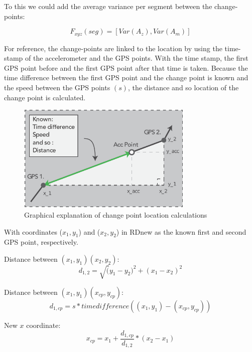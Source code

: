 To this we could add the average variance per segment between the change-points:

\begin{equation}
F_{xyz}(seg) = [Var(A_{z}), Var(A_{m})]
\end{equation}

For reference, the change-points are linked to the location by using the time-stamp of the accelerometer and the GPS points. With the time stamp, the first GPS point before and the first GPS point after that time is taken. Because the time difference between the first GPS point and the change point is known and the speed between the GPS points $(s)$, the distance and so location of the change point is calculated. 

\begin{figure}[h]
\includegraphics[width=0.75\textwidth]{img/M_location_calc.pdf}
\centering
\caption{Graphical explanation of change point location calculations \label{cpcalc}}
\end{figure}

With coordinates ($x_{1}, y_{1}$) and  ($x_{2}, y_{2}$) in RDnew as the known first and second GPS point, respectively. 

Distance between $(x_{1}, y_{1})(x_{2}, y_{2})$:
\begin{equation}
d_{1,2} = \sqrt (y_{1}-y_{2})^2 + (x_{1}-x_{2})^2 
\end{equation}

Distance between $(x_{1}, y_{1})(x_{cp}, y_{cp})$:
\begin{equation}
d_{1,cp} = s * time difference((x_{1}, y_{1}) - (x_{cp}, y_{cp}))
\end{equation}

New $x$ coordinate:
\begin{equation}
x_{cp} = x_{1} +  \frac{d_{1,cp}}{d_{1,2}} * (x_{2} - x_{1})
\end{equation}

